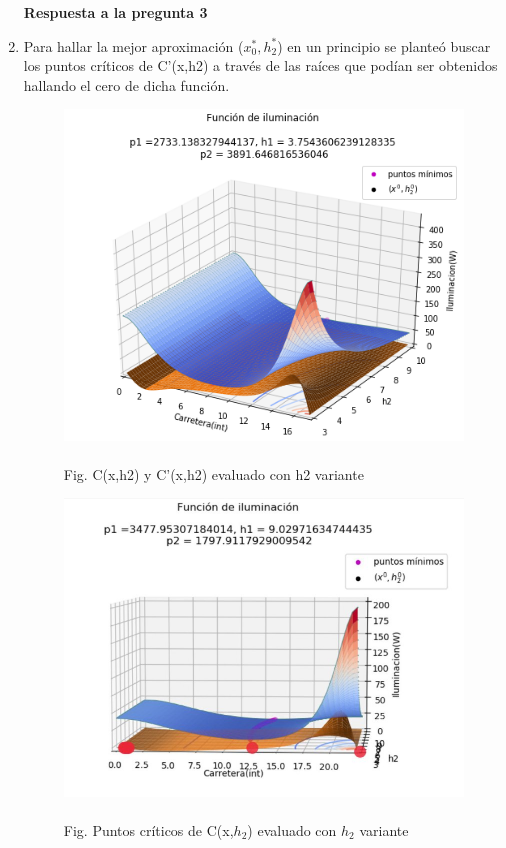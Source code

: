 \documentclass[11pt]{article}
\begin{document}
\begin{enumerate}
    \vspace{0.5cm}
    \noindent \textbf{Respuesta a la pregunta 3}
    \item 
        Para hallar la mejor aproximación ($x^*_0, h^*_2$) en un principio se planteó buscar los puntos críticos de C'(x,h2) a través de las raíces que podían ser obtenidos hallando el cero de dicha función.

        \begin{figure}[!h]
        	\includegraphics[keepaspectratio, width=13cm]{Imagenes/derivada3d.png}
        	\caption{\\Fig.  C(x,h2) y C’(x,h2) evaluado con h2 variante
        	\label{fig:grafica3}}
        \end{figure}
        \begin{figure}[!h]
        	\includegraphics[keepaspectratio, width=15cm]{Imagenes/derivada3dp.jpeg}
        	\caption{\\Fig. Puntos críticos de C(x,$h_2$) evaluado con $h_2$ variante \label{fig:grafica3}}
        \end{figure}
        

\end{enumerate}
\end{document}
